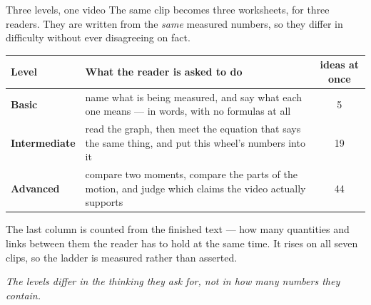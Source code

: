\documentclass[aspectratio=169,11pt]{beamer}
\newcommand{\takeaway}[1]{\vfill{\small\itshape\color{cGrey}#1\par}}
\begin{document}
\begin{frame}{Three levels, one video}
\vspace{2pt}
\small
The same clip becomes three worksheets, for three readers. They are written from the \emph{same}
measured numbers, so they differ in difficulty without ever disagreeing on fact.
\vspace{6pt}

\renewcommand{\arraystretch}{1.5}
\begin{center}
\begin{tabular}{@{}lp{7.3cm}c@{}}
\toprule
\rowcolor{cApp!12}
\textbf{Level} & \textbf{What the reader is asked to do} & \textbf{ideas at once} \\
\midrule
\textbf{\color{cBasic}Basic} & name what is being measured, and say what each one means --- in
words, with no formulas at all & 5 \\
\textbf{\color{cInter}Intermediate} & read the graph, then meet the equation that says the same
thing, and put this wheel's numbers into it & 19 \\
\textbf{\color{cAdv}Advanced} & compare two moments, compare the parts of the motion, and judge
which claims the video actually supports & 44 \\
\bottomrule
\end{tabular}
\end{center}
\vspace{4pt}

{\scriptsize\color{cGrey}The last column is counted from the finished text --- how many quantities
and links between them the reader has to hold at the same time. It rises on all seven clips, so the
ladder is measured rather than asserted.}
\takeaway{The levels differ in the thinking they ask for, not in how many numbers they contain.}
\end{frame}
\end{document}
